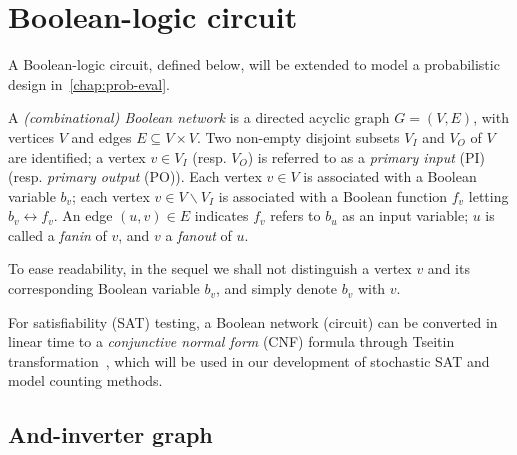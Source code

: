 \section{Boolean-logic circuit}
\label{sect:circuit}

A Boolean-logic circuit, defined below, will be extended to model a probabilistic design in~\cref{chap:prob-eval}.

\begin{definition}\label{def:Boolean network}
    A \emph{(combinational) Boolean network} is a directed acyclic
    graph $G=(V,E)$, with vertices $V$ and edges $E \subseteq V \times
        V$. Two non-empty disjoint subsets $V_I$ and $V_O$ of $V$ are
    identified; a vertex $v \in V_I$ (resp. $V_O$) is referred to as a
    \emph{primary input} (PI) (resp. \emph{primary output} (PO)). Each
    vertex $v \in V$ is associated with a Boolean variable $b_v$; each
    vertex $v \in V \backslash V_I$ is associated with a Boolean
    function $f_v$ letting $b_v \leftrightarrow f_v$. An edge $(u,v)
        \in E$ indicates $f_v$ refers to $b_u$ as an input variable; $u$
    is called a \emph{fanin} of $v$, and $v$ a \emph{fanout} of $u$.
\end{definition}
To ease readability, in the sequel we shall not distinguish a
vertex $v$ and its corresponding Boolean variable $b_v$, and
simply denote $b_v$ with $v$.

For satisfiability (SAT) testing, a Boolean network (circuit) can
be converted in linear time to a \emph{conjunctive normal form}
(CNF) formula through Tseitin transformation~\cite{Tseitin1983},
which will be used in our development of stochastic SAT and model
counting methods.

\subsection{And-inverter graph}